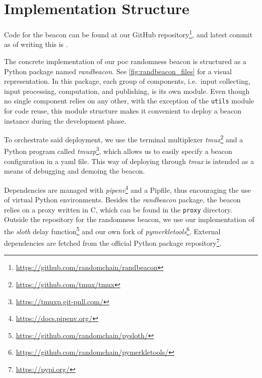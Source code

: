 \section{Implementation Structure}%
\label{app:beacon_code}

Code for the beacon can be found at our GitHub repository\footnote{\url{https://github.com/randomchain/randbeacon}}, and latest commit as of writing this is .

\bigskip\noindent
The concrete implementation of our \gls{poc} randomness beacon is structured as a Python package named \textit{randbeacon}. See \cref{fig:randbeacon_files} for a visual representation.
In this package, each group of components, i.e.\ input collecting, input processing, computation, and publishing, is its own module.
Even though no single component relies on any other, with the exception of the \texttt{utils} module for code reuse, this module structure makes it convenient to deploy a beacon instance during the development phase.

To orchestrate said deployment, we use the terminal multiplexer \textit{tmux}\footnote{\url{https://github.com/tmux/tmux}} and a Python program called \textit{tmuxp}\footnote{\url{https://tmuxp.git-pull.com/}}, which allows us to easily specify a beacon configuration in a yaml file.
This way of deploying through \textit{tmux} is intended as a means of debugging and demoing the beacon.

Dependencies are managed with \textit{pipenv}\footnote{\url{https://docs.pipenv.org/}} and a Pipfile, thus encouraging the use of virtual Python environments.
Besides the \textit{randbeacon} package, the beacon relies on a proxy written in C, which can be found in the \texttt{proxy} directory.
Outside the repository for the randomness beacon, we use our implementation of the \textit{sloth} delay function\footnote{\url{https://github.com/randomchain/pysloth/}} and our own fork of \textit{pymerkletools}\footnote{\url{https://github.com/randomchain/pymerkletools/}}.
External dependencies are fetched from the official Python package repository\footnote{\url{https://pypi.org/}}.


